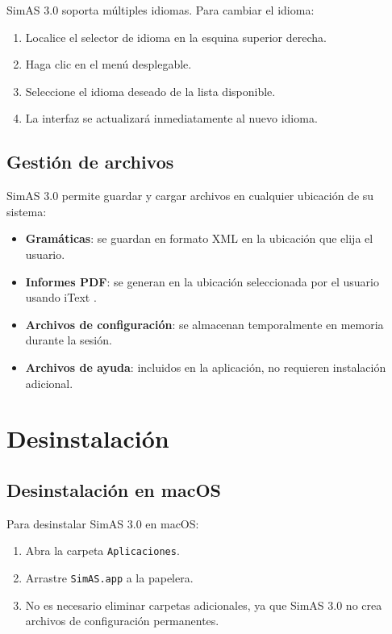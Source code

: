 SimAS 3.0 soporta múltiples idiomas. Para cambiar el idioma:

\begin{enumerate}
    \item Localice el selector de idioma en la esquina superior derecha.
    \item Haga clic en el menú desplegable.
    \item Seleccione el idioma deseado de la lista disponible.
    \item La interfaz se actualizará inmediatamente al nuevo idioma.
\end{enumerate}

\subsection{Gestión de archivos}

SimAS 3.0 permite guardar y cargar archivos en cualquier ubicación de su sistema:

\begin{itemize}
    \item \textbf{Gramáticas}: se guardan en formato XML \cite{xml} en la ubicación que elija el usuario.
    \item \textbf{Informes PDF}: se generan en la ubicación seleccionada por el usuario usando iText \cite{itextpdf}.
    \item \textbf{Archivos de configuración}: se almacenan temporalmente en memoria durante la sesión.
    \item \textbf{Archivos de ayuda}: incluidos en la aplicación, no requieren instalación adicional.
\end{itemize}

\section{Desinstalación}

\subsection{Desinstalación en macOS}

Para desinstalar SimAS 3.0 en macOS:

\begin{enumerate}
    \item Abra la carpeta \texttt{Aplicaciones}.
    \item Arrastre \texttt{SimAS.app} a la papelera.
    \item No es necesario eliminar carpetas adicionales, ya que SimAS 3.0 no crea archivos de configuración permanentes.
\end{enumerate}

